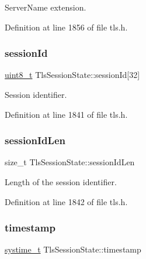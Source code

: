 Server\+Name extension. 



Definition at line 1856 of file tls.\+h.

\mbox{\label{structTlsSessionState_a784cd9c073b07b51f1cf315e9fb19768}} 
\subsubsection{\texorpdfstring{session\+Id}{sessionId}}
{\footnotesize\ttfamily \hyperlink{stdint_8h_aba7bc1797add20fe3efdf37ced1182c5}{uint8\+\_\+t} Tls\+Session\+State\+::session\+Id\mbox{[}32\mbox{]}}



Session identifier. 



Definition at line 1841 of file tls.\+h.

\mbox{\label{structTlsSessionState_a679cbf66e41da3f5e6ae7d25c8ef363e}} 
\subsubsection{\texorpdfstring{session\+Id\+Len}{sessionIdLen}}
{\footnotesize\ttfamily size\+\_\+t Tls\+Session\+State\+::session\+Id\+Len}



Length of the session identifier. 



Definition at line 1842 of file tls.\+h.

\mbox{\label{structTlsSessionState_a6923caefbda8f5283ff9920459485f0b}} 
\subsubsection{\texorpdfstring{timestamp}{timestamp}}
{\footnotesize\ttfamily \hyperlink{compiler__port_8h_ae3e32a98d431a02106616da3071832dd}{systime\+\_\+t} Tls\+Session\+State\+::timestamp}



